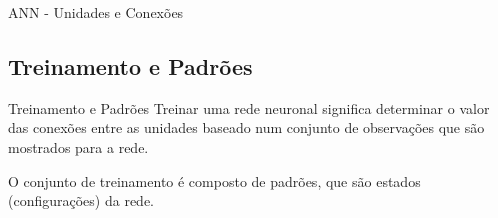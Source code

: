 \begin{frame}{ANN - Unidades e Conexões}%
\end{frame}

\subsection{Treinamento e Padrões}%
\begin{frame}{Treinamento e Padrões}%
  \justifying%
  Treinar uma rede neuronal significa determinar o valor das conexões entre as unidades baseado num conjunto de observações que são mostrados para a rede.

  O conjunto de treinamento é composto de padrões, que são estados (configurações) da rede.
\end{frame}
